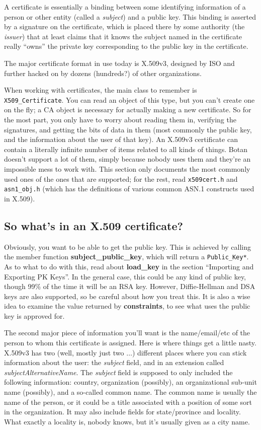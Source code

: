 \documentclass{article}
\newcommand{\filename}[1]{\texttt{#1}}
\newcommand{\function}[1]{\textbf{#1}}
\newcommand{\type}[1]{\texttt{#1}}
\begin{document}
A certificate is essentially a binding between some identifying information of
a person or other entity (called a \emph{subject}) and a public key. This
binding is asserted by a signature on the certificate, which is placed there by
some authority (the \emph{issuer}) that at least claims that it knows the
subject named in the certificate really ``owns'' the private key
corresponding to the public key in the certificate.

The major certificate format in use today is X.509v3, designed by ISO and
further hacked on by dozens (hundreds?) of other organizations.

When working with certificates, the main class to remember is
\type{X509\_Certificate}. You can read an object of this type, but you can't
create one on the fly; a CA object is necessary for actually making a new
certificate. So for the most part, you only have to worry about reading them
in, verifying the signatures, and getting the bits of data in them (most
commonly the public key, and the information about the user of that key). An
X.509v3 certificate can contain a literally infinite number of items related to
all kinds of things. Botan doesn't support a lot of them, simply because nobody
uses them and they're an impossible mess to work with. This section only
documents the most commonly used ones of the ones that are supported; for the
rest, read \filename{x509cert.h} and \filename{asn1\_obj.h} (which has the
definitions of various common ASN.1 constructs used in X.509).

\subsection{So what's in an X.509 certificate?}

Obviously, you want to be able to get the public key. This is achieved by
calling the member function \function{subject\_public\_key}, which will return
a \type{Public\_Key*}. As to what to do with this, read about
\function{load\_key} in the section ``Importing and Exporting PK Keys''. In the
general case, this could be any kind of public key, though 99\% of the time it
will be an RSA key. However, Diffie-Hellman and DSA keys are also supported, so
be careful about how you treat this. It is also a wise idea to examine the
value returned by \function{constraints}, to see what uses the public key is
approved for.

The second major piece of information you'll want is the name/email/etc of the
person to whom this certificate is assigned. Here is where things get a little
nasty. X.509v3 has two (well, mostly just two $\ldots$) different places where
you can stick information about the user: the \emph{subject} field, and in an
extension called \emph{subjectAlternativeName}. The \emph{subject} field is
supposed to only included the following information: country, organization
(possibly), an organizational sub-unit name (possibly), and a so-called common
name. The common name is usually the name of the person, or it could be a title
associated with a position of some sort in the organization. It may also
include fields for state/province and locality. What exactly a locality is,
nobody knows, but it's usually given as a city name.
\end{document}
